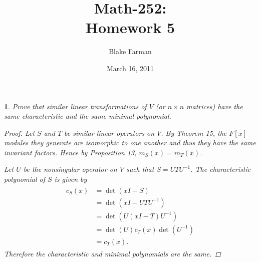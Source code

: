 \documentclass[10pt]{amsart}
\author{Blake Farman}
\title{Math-252:\\Homework 5}
\date{March 16, 2011}\pdfpagewidth 8.5in
\begin{document}
\maketitle

\newtheorem{thm}{}

\begin{thm}
  \label{Ex1}
  Prove that similar linear transformations of $V$ (or $n \times n$ matrices) have the same characteristic and the same minimal polynomial.
  \begin{proof}
    Let $S$ and $T$ be similar linear operators on $V$.  
    By Theorem 15, the $F[x]$-modules they generate are isomorphic to one another and thus they have the same invariant factors.
    Hence by Proposition 13, $m_S(x) = m_T(x)$.
    
    Let $U$ be the nonsingular operator on $V$ such that $S = UTU^{-1}$.
    The characteristic polynomial of $S$ is given by 
    \begin{align*}
      \begin{split}
        c_S(x) &= \det(xI - S)\\
        & = \det(xI - UTU^{-1})\\
        & = \det(U(xI - T)U^{-1})\\
        & = \det(U)c_T(x)\det(U^{-1})\\
        & = c_T(x).
        \end{split}
      \end{align*}
      Therefore the characteristic and minimal polynomials are the same.
  \end{proof}
\end{thm}
\end{document}
